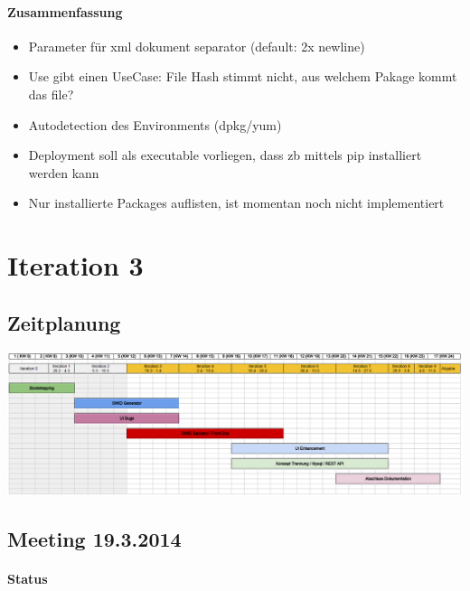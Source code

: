 \paragraph{Zusammenfassung}
\begin{itemize}
\item Parameter für xml dokument separator (default: 2x newline)
\item Use gibt einen UseCase: File Hash stimmt nicht, aus welchem Pakage kommt das file?
\item Autodetection des Environments (dpkg/yum)
\item Deployment soll als executable vorliegen, dass zb mittels pip installiert werden kann
\item Nur installierte Packages auflisten, ist momentan noch nicht implementiert
\end{itemize}

\section{Iteration 3}
\subsection{Zeitplanung}
\includegraphics[scale=0.3]{images/zeitplanung/Iteration3.jpg}
\subsection{Meeting 19.3.2014}
\paragraph{Status}


